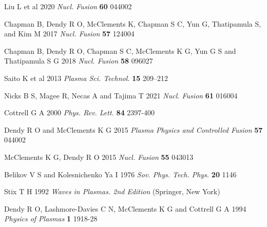 \documentclass[12pt]{iopart}
\begin{document}
\begin{thebibliography}{9}
Liu L et al 2020  \textit{Nucl. Fusion} \textbf{60} 044002

Chapman B, Dendy R O, McClements K, Chapman S C, Yun G, Thatipamula S, and Kim M 2017 \textit{Nucl. Fusion} \textbf{57} 124004

Chapman B, Dendy R O, Chapman S C, McClements K G, Yun G S and Thatipamula S G 2018 \textit{Nucl. Fusion} \textbf{58} 096027

Saito K et al 2013 \textit{Plasma Sci. Technol.} \textbf{15} 209–212

Nicks B S, Magee R, Necas A and Tajima T 2021 \textit{Nucl. Fusion} \textbf{61} 016004

Cottrell G A 2000 \textit{Phys. Rev. Lett.} \textbf{84} 2397-400

Dendy R O and McClements K G 2015 \textit{Plasma Physics and Controlled Fusion} \textbf{57} 044002

McClements K G, Dendy R O 2015 \textit{Nucl. Fusion} \textbf{55} 043013

Belikov V S and Kolesnichenko Ya I 1976 \textit{Sov. Phys. Tech. Phys.} \textbf{20} 1146

Stix T H 1992 \textit{Waves in Plasmas. 2nd Edition} (Springer, New York)

Dendy R O, Lashmore-Davies C N, McClements K G and Cottrell G A 1994 \textit{Physics of Plasmas} \textbf{1} 1918-28


\end{thebibliography}
\end{document}
